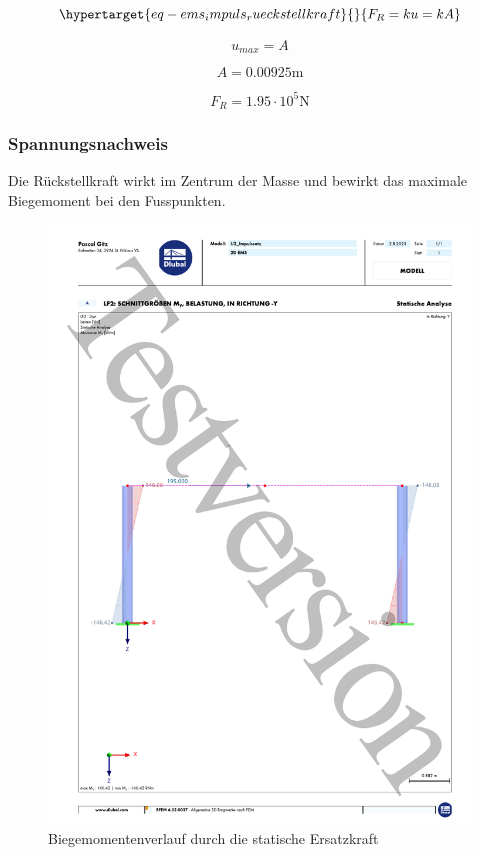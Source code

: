 \documentclass[
  letterpaper,
  DIV=11]{scrreprt}
\begin{document}
\begin{equation}\protect\hypertarget{eq-ems_impuls_rueckstellkraft}{}{
F_R = k   u = k   A
}\label{eq-ems_impuls_rueckstellkraft}\end{equation}

\begin{equation}u_{max} = A\end{equation}

\begin{equation}A = 0.00925 \text{m}\end{equation}

\begin{equation}F_{R} = 1.95 \cdot 10^{5} \text{N}\end{equation}

\hypertarget{spannungsnachweis}{%
\subsubsection{Spannungsnachweis}\label{spannungsnachweis}}

Die Rückstellkraft wirkt im Zentrum der Masse und bewirkt das maximale
Biegemoment bei den Fusspunkten.

\begin{figure}[H]

{\centering \includegraphics{bilder/impulssatz_momentenverlauf.pdf}

}

\caption{Biegemomentenverlauf durch die statische Ersatzkraft}

\end{figure}
\end{document}
